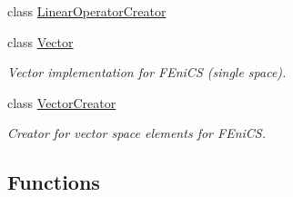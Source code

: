 \begin{DoxyCompactItemize}
class \hyperlink{classSpacy_1_1FEniCS_1_1LinearOperatorCreator}{Linear\-Operator\-Creator}
\item 
class \hyperlink{classSpacy_1_1FEniCS_1_1Vector}{Vector}
\begin{DoxyCompactList}\small\item\em Vector implementation for F\-Eni\-C\-S (single space). \end{DoxyCompactList}\item 
class \hyperlink{classSpacy_1_1FEniCS_1_1VectorCreator}{Vector\-Creator}
\begin{DoxyCompactList}\small\item\em Creator for vector space elements for F\-Eni\-C\-S. \end{DoxyCompactList}\end{DoxyCompactItemize}
\subsection*{Functions}
